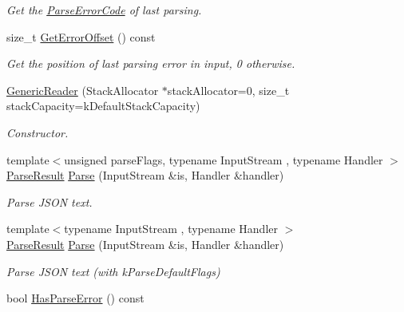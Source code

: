 \begin{DoxyCompactItemize}
\begin{DoxyCompactList}\small\item\em Get the \hyperlink{group___r_a_p_i_d_j_s_o_n___e_r_r_o_r_s_ga8d4b32dfc45840bca189ade2bbcb6ba7}{Parse\+Error\+Code} of last parsing. \end{DoxyCompactList}\item 
size\+\_\+t \hyperlink{class_generic_reader_a77399ac40cca1fb113a2d507f476b4e7}{Get\+Error\+Offset} () const \hypertarget{class_generic_reader_a77399ac40cca1fb113a2d507f476b4e7}{}\label{class_generic_reader_a77399ac40cca1fb113a2d507f476b4e7}

\begin{DoxyCompactList}\small\item\em Get the position of last parsing error in input, 0 otherwise. \end{DoxyCompactList}\item 
\hyperlink{class_generic_reader_aab875a34b3092df9fb4e2b8eac6dbb96}{Generic\+Reader} (Stack\+Allocator $\ast$stack\+Allocator=0, size\+\_\+t stack\+Capacity=k\+Default\+Stack\+Capacity)
\begin{DoxyCompactList}\small\item\em Constructor. \end{DoxyCompactList}\item 
{\footnotesize template$<$unsigned parse\+Flags, typename Input\+Stream , typename Handler $>$ }\\\hyperlink{struct_parse_result}{Parse\+Result} \hyperlink{class_generic_reader_a0c450620d14ff1824e58bb7bd9b42099}{Parse} (Input\+Stream \&is, Handler \&handler)
\begin{DoxyCompactList}\small\item\em Parse J\+S\+ON text. \end{DoxyCompactList}\item 
{\footnotesize template$<$typename Input\+Stream , typename Handler $>$ }\\\hyperlink{struct_parse_result}{Parse\+Result} \hyperlink{class_generic_reader_a76d91e5fd8dfe48aea7dd6d8a51dd6dc}{Parse} (Input\+Stream \&is, Handler \&handler)
\begin{DoxyCompactList}\small\item\em Parse J\+S\+ON text (with k\+Parse\+Default\+Flags) \end{DoxyCompactList}\item 
bool \hyperlink{class_generic_reader_aa9d10652062557ebf26cf414bfeabf84}{Has\+Parse\+Error} () const \hypertarget{class_generic_reader_aa9d10652062557ebf26cf414bfeabf84}{}\label{class_generic_reader_aa9d10652062557ebf26cf414bfeabf84}


\end{DoxyCompactItemize}
